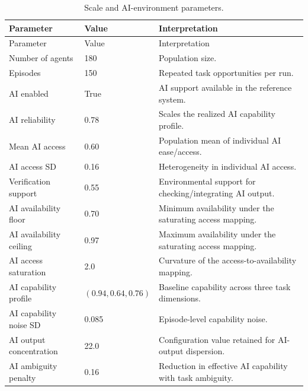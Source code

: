\documentclass[11pt]{article}
\begin{document}
\begin{longtable}{p{}p{}p{}}
\caption{Scale and AI-environment parameters.}\label{tab:param_ai}\\
\toprule Parameter & Value & Interpretation \\
\midrule\endfirsthead\toprule Parameter & Value & Interpretation \\
\midrule\endhead
Number of agents & 180 & Population size. \\
Episodes & 150 & Repeated task opportunities per run. \\
AI enabled & True & AI support available in the reference system. \\
AI reliability & 0.78 & Scales the realized AI capability profile. \\
Mean AI access & 0.60 & Population mean of individual AI ease/access. \\
AI access SD & 0.16 & Heterogeneity in individual AI access. \\
Verification support & 0.55 & Environmental support for checking/integrating AI output. \\
AI availability floor & 0.70 & Minimum availability under the saturating access mapping. \\
AI availability ceiling & 0.97 & Maximum availability under the saturating access mapping. \\
AI access saturation & 2.0 & Curvature of the access-to-availability mapping. \\
AI capability profile & $(0.94,0.64,0.76)$ & Baseline capability across three task dimensions. \\
AI capability noise SD & 0.085 & Episode-level capability noise. \\
AI output concentration & 22.0 & Configuration value retained for AI-output dispersion. \\
AI ambiguity penalty & 0.16 & Reduction in effective AI capability with task ambiguity. \\
\bottomrule
\end{longtable}
\end{document}
